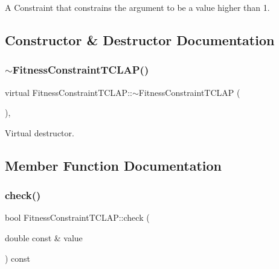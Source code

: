A Constraint that constrains the argument to be a value higher than 1. 

\subsection{Constructor \& Destructor Documentation}
\hypertarget{class_fitness_constraint_t_c_l_a_p_ab93c10fccc276c8196da33f1d142e0ac}{}\label{class_fitness_constraint_t_c_l_a_p_ab93c10fccc276c8196da33f1d142e0ac} 
\subsubsection{\texorpdfstring{$\sim$\+Fitness\+Constraint\+T\+C\+L\+A\+P()}{~FitnessConstraintTCLAP()}}
{\footnotesize\ttfamily virtual Fitness\+Constraint\+T\+C\+L\+A\+P\+::$\sim$\+Fitness\+Constraint\+T\+C\+L\+AP (\begin{DoxyParamCaption}{ }\end{DoxyParamCaption})\hspace{0.3cm}{\ttfamily [inline]}, {\ttfamily [virtual]}}

Virtual destructor. 

\subsection{Member Function Documentation}
\hypertarget{class_fitness_constraint_t_c_l_a_p_a0725bc1fdded2825e09df3c11f0a3320}{}\label{class_fitness_constraint_t_c_l_a_p_a0725bc1fdded2825e09df3c11f0a3320} 
\subsubsection{\texorpdfstring{check()}{check()}}
{\footnotesize\ttfamily bool Fitness\+Constraint\+T\+C\+L\+A\+P\+::check (\begin{DoxyParamCaption}\item[{double const \&}]{value }\end{DoxyParamCaption}) const\hspace{0.3cm}{\ttfamily [virtual]}}



